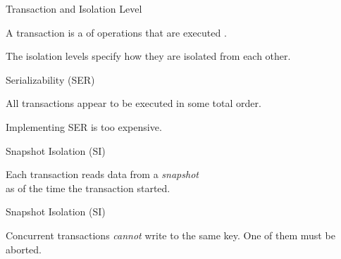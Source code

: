 
\begin{frame}{Transaction and Isolation Level}
  \begin{center}
    A transaction is a  of operations
    that are executed .

    \vspace{0.30cm}
		\resizebox{0.55\textwidth}{!}{}

    \vspace{0.20cm}
    The isolation levels specify how they are isolated from each other.
  \end{center}
\end{frame}

\begin{frame}{Serializability (SER)}
  \begin{center}
    All transactions appear to be executed in some total order.

    \vspace{0.30cm}
		\resizebox{0.50\textwidth}{!}{}

    \vspace{0.20cm}
    Implementing SER is too expensive.
  \end{center}
\end{frame}

\begin{frame}{Snapshot Isolation (SI)}
  \begin{center}
		\resizebox{0.50\textwidth}{!}{}

    \vspace{0.20cm}
     Each transaction reads data from a {\it snapshot} \\
      as of the time the transaction started.
  \end{center}
\end{frame}

\begin{frame}{Snapshot Isolation (SI)}
  \begin{center}
    \resizebox{0.48\textwidth}{!}{}
  \end{center}

  \vspace{-0.50cm}
    Concurrent transactions {\it cannot} write to the same key.
    One of them must be aborted.
\end{frame}

